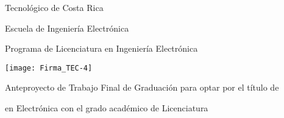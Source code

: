 {}

\thispagestyle{empty} 

\begin{center}

Tecnológico de Costa Rica

\par\vspace{1ex}

Escuela de Ingeniería Electrónica

\par\vspace{1ex}

Programa de Licenciatura en Ingeniería Electrónica

\par\vspace{20mm}

\texttt{[image: Firma\_TEC-4]}

\par\vspace*{\fill}

{\large\bf{\thesisTitle\par}}

\par\vspace*{\fill}

Anteproyecto de Trabajo Final de Graduación para optar por el título de

\thesisAuthorDegree{} en Electrónica con el grado académico de Licenciatura

\par\vspace{20mm}

\thesisAuthor

\vspace*{\fill}

\end{center}
\newpage 
\cleardoublepage 


